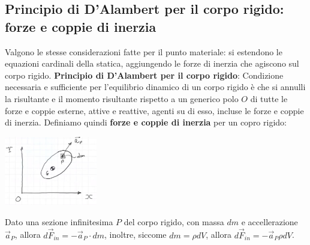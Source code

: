 \subsection{Principio di D'Alambert per il corpo rigido: forze e coppie di inerzia}
Valgono le stesse considerazioni fatte per il punto materiale: si estendono le equazioni cardinali della statica, aggiungendo le forze di inerzia che agiscono sul corpo rigido.\newline
\newline
\textbf{Principio di D'Alambert per il corpo rigido}:\newline
Condizione necessaria e sufficiente per l'equilibrio dinamico di un corpo rigido è che si annulli la risultante e il momento risultante rispetto a un generico polo $O$ di tutte le forze e coppie esterne, attive e reattive, agenti su di esso, incluse le forze e coppie di inerzia.\newline
\newline
Definiamo quindi \textbf{forze e coppie di inerzia} per un copro rigido:
\begin{center}
    \includegraphics[height=3cm]{../lezione9/img1.JPG}
\end{center}
Dato una sezione infinitesima $P$ del corpo rigido, con massa $dm$ e accellerazione $\vec{a}_P$, allora $d \vec{F}_{in} = - \vec{a}_P \cdot dm$, inoltre, siccome $dm = \rho dV$, allora $d \vec{F}_{in} = - \vec{a}_P \rho dV$.
